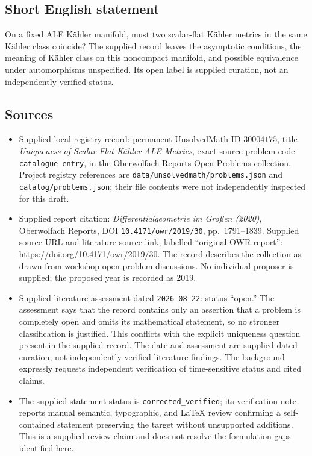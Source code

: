 \documentclass[11pt]{article}
\begin{document}
\subsection{Short English statement}
On a fixed ALE Kähler manifold, must two scalar-flat Kähler metrics in the same Kähler class coincide? The supplied record leaves the asymptotic conditions, the meaning of Kähler class on this noncompact manifold, and possible equivalence under automorphisms unspecified. Its open label is supplied curation, not an independently verified status.
\subsection{Sources}
\begin{itemize}
\item Supplied local registry record: permanent UnsolvedMath ID \(30004175\), title \emph{Uniqueness of Scalar-Flat Kähler ALE Metrics}, exact source problem code \texttt{catalogue entry}, in the Oberwolfach Reports Open Problems collection. Project registry references are \texttt{data/unsolvedmath/problems.json} and \texttt{catalog/problems.json}; their file contents were not independently inspected for this draft.
\item Supplied report citation: \emph{Differentialgeometrie im Großen (2020)}, Oberwolfach Reports, DOI \texttt{10.4171/owr/2019/30}, pp.\ 1791--1839. Supplied source URL and literature-source link, labelled ``original OWR report'': \url{https://doi.org/10.4171/owr/2019/30}. The record describes the collection as drawn from workshop open-problem discussions. No individual proposer is supplied; the proposed year is recorded as 2019.
\item Supplied literature assessment dated \texttt{2026-08-22}: status ``open.'' The assessment says that the record contains only an assertion that a problem is completely open and omits its mathematical statement, so no stronger classification is justified. This conflicts with the explicit uniqueness question present in the supplied record. The date and assessment are supplied dated curation, not independently verified literature findings. The background expressly requests independent verification of time-sensitive status and cited claims.
\item The supplied statement status is \texttt{corrected\_verified}; its verification note reports manual semantic, typographic, and LaTeX review confirming a self-contained statement preserving the target without unsupported additions. This is a supplied review claim and does not resolve the formulation gaps identified here.
\end{itemize}
\end{document}
